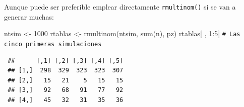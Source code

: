 \documentclass[
  10pt,
]{book}
\newenvironment{Shaded}{\begin{snugshade}}{\end{snugshade}}
\newcommand{\CommentTok}[1]{\textcolor[rgb]{0.56,0.35,0.01}{\textit{#1}}}
\newcommand{\DecValTok}[1]{\textcolor[rgb]{0.00,0.00,0.81}{#1}}
\newcommand{\FunctionTok}[1]{\textcolor[rgb]{0.00,0.00,0.00}{#1}}
\newcommand{\NormalTok}[1]{#1}
\newcommand{\OtherTok}[1]{\textcolor[rgb]{0.56,0.35,0.01}{#1}}
\newcommand{\SpecialCharTok}[1]{\textcolor[rgb]{0.00,0.00,0.00}{#1}}
\theoremstyle{break}
\theoremstyle{nonumberplain}
\renewcommand{\CommentTok}[1]{\textcolor[rgb]{0.41,0.41,0.41}{\texttt{#1}}}
\begin{document}
Aunque puede ser preferible emplear directamente \texttt{rmultinom()} si se van a generar muchas:

\begin{Shaded}
\begin{Highlighting}[]
\NormalTok{ntsim }\OtherTok{\textless{}{-}} \DecValTok{1000}
\NormalTok{rtablas }\OtherTok{\textless{}{-}} \FunctionTok{rmultinom}\NormalTok{(ntsim, }\FunctionTok{sum}\NormalTok{(n), pz)}
\NormalTok{rtablas[ , }\DecValTok{1}\SpecialCharTok{:}\DecValTok{5}\NormalTok{] }\CommentTok{\# Las cinco primeras simulaciones}
\end{Highlighting}
\end{Shaded}

\begin{verbatim}
 ##      [,1] [,2] [,3] [,4] [,5]
 ## [1,]  298  329  323  323  307
 ## [2,]   15   21    5   15   15
 ## [3,]   92   68   91   77   92
 ## [4,]   45   32   31   35   36
\end{verbatim}
\end{document}
